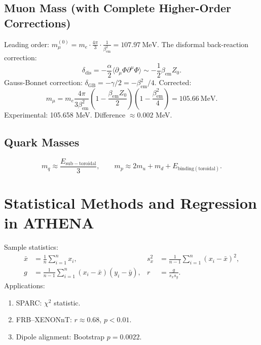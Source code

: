 \documentclass[12pt, a4paper]{article}
\begin{document}
\subsection{Muon Mass (with Complete Higher-Order Corrections)}
Leading order: $m_\mu^{(0)} = m_e \cdot \frac{4\pi}{3} \cdot \frac{1}{\beta_{\mathrm{em}}^2} = 107.97\ \mathrm{MeV}$.
The disformal back-reaction correction:
\begin{equation}
\delta_{\mathrm{dis}} = -\frac{\alpha}{2}\langle \partial_\mu \Phi \partial^\mu \Phi \rangle \sim -\frac{1}{2}\beta_{\mathrm{em}} Z_0.
\end{equation}
Gauss-Bonnet correction: $\delta_{\mathrm{GB}} = -\gamma/2 = -\beta_{\mathrm{em}}^2/4$.
Corrected:
\begin{equation}
m_\mu = m_e \frac{4\pi}{3\beta_{\mathrm{em}}^2} \left(1 - \frac{\beta_{\mathrm{em}} Z_0}{2}\right) \left(1 - \frac{\beta_{\mathrm{em}}^2}{4}\right) = 105.66\ \mathrm{MeV}.
\label{eq:muon_mass}
\end{equation}
Experimental: 105.658 MeV. Difference $\approx 0.002$ MeV.

\subsection{Quark Masses}
\begin{equation}
m_q \approx \frac{E_{\mathrm{sub-toroidal}}}{3}, \qquad m_p \approx 2m_u + m_d + E_{\mathrm{binding(toroidal)}}.
\label{eq:quark_masses}
\end{equation}

\section{Statistical Methods and Regression in ATHENA}
\label{sec:statistical}
Sample statistics:
\begin{align}
\bar{x} &= \frac{1}{n} \sum_{i=1}^n x_i, &
s_x^2 &= \frac{1}{n-1} \sum_{i=1}^n (x_i - \bar{x})^2, \\
g &= \frac{1}{n-1} \sum_{i=1}^n (x_i - \bar{x})(y_i - \bar{y}), &
r &= \frac{g}{s_x s_y}.
\label{eq:statistics}
\end{align}
Applications:
\begin{enumerate}
    \item SPARC: $\chi^2$ statistic.
    \item FRB–XENONnT: $r \approx 0.68$, $p < 0.01$.
    \item Dipole alignment: Bootstrap $p = 0.0022$.
\end{enumerate}
\end{document}

